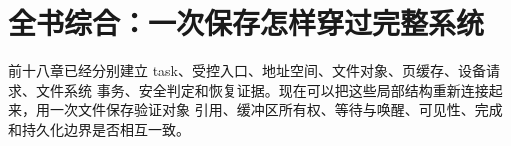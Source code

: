 \chapter*{全书综合：一次保存怎样穿过完整系统}

前十八章已经分别建立 task、受控入口、地址空间、文件对象、页缓存、设备请求、文件系统
事务、安全判定和恢复证据。现在可以把这些局部结构重新连接起来，用一次文件保存验证对象
引用、缓冲区所有权、等待与唤醒、可见性、完成和持久化边界是否相互一致。

